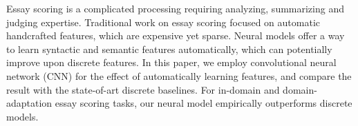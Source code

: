 Essay scoring is a complicated processing requiring analyzing, summarizing and judging expertise. Traditional work on essay scoring focused on automatic handcrafted features, which are expensive yet sparse. Neural models offer a way to learn syntactic and semantic features automatically, which can potentially improve upon discrete features. In this paper, we employ convolutional neural network (CNN) for the effect of automatically learning features, and compare the result with the state-of-art discrete baselines. For in-domain and domain-adaptation essay scoring tasks, our neural model empirically outperforms discrete models.
